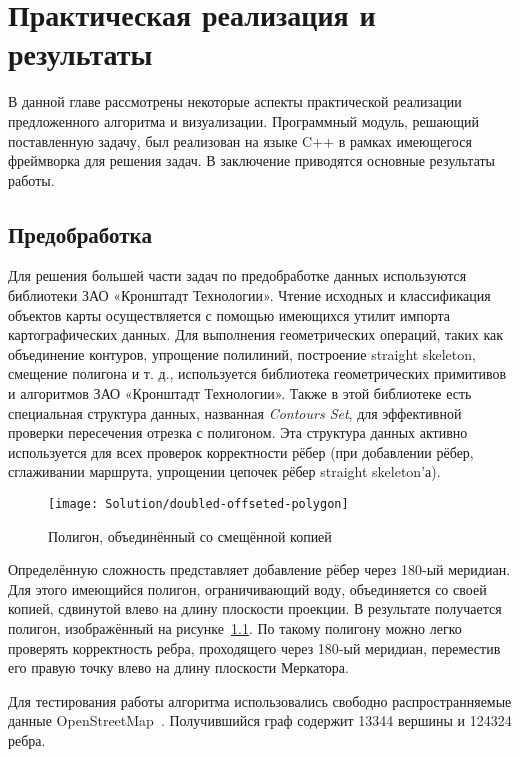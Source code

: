 \chapter{Практическая реализация и результаты}

В данной главе рассмотрены некоторые аспекты практической реализации
предложенного алгоритма и визуализации. Программный модуль, решающий
поставленную задачу, был реализован на языке C++ в рамках имеющегося
фреймворка для решения задач. В заключение приводятся основные
результаты работы.

\FloatBarrier

\section{Предобработка}

Для решения большей части задач по предобработке данных используются
библиотеки ЗАО «Кронштадт Технологии». Чтение исходных и классификация
объектов карты осуществляется с помощью имеющихся утилит импорта
картографических данных. Для выполнения геометрических операций, таких
как объединение контуров, упрощение полилиний, построение straight
skeleton, смещение полигона и т. д., используется библиотека
геометрических примитивов и алгоритмов ЗАО «Кронштадт Технологии».
Также в этой библиотеке есть специальная структура данных, названная
\emph{Contours Set}, для эффективной проверки пересечения отрезка с
полигоном. Эта структура данных активно используется для всех проверок
корректности рёбер (при добавлении рёбер, сглаживании маршрута,
упрощении цепочек рёбер straight skeleton'а).

\begin{figure}
    \texttt{[image: Solution/doubled-offseted-polygon]}
    \caption{Полигон, объединённый со смещённой копией}
    \label{fig:doubled-polygon}
\end{figure}

Определённую сложность представляет добавление рёбер через 180-ый
меридиан. Для этого имеющийся полигон, ограничивающий воду,
объединяется со своей копией, сдвинутой влево на длину плоскости
проекции. В результате получается полигон, изображённый на
рисунке~\ref{fig:doubled-polygon}. По такому полигону можно легко
проверять корректность ребра, проходящего через 180-ый меридиан,
переместив его правую точку влево на длину плоскости Меркатора.

Для тестирования работы алгоритма использовались свободно
распространняемые данные OpenStreetMap~\cite{osm}. Получившийся граф
содержит 13344 вершины и 124324 ребра.

